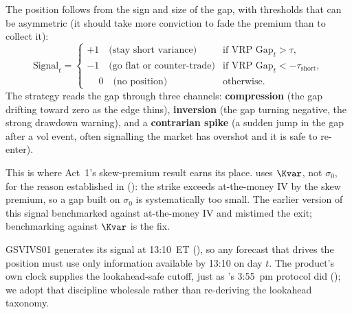 The position follows from the sign and size of the gap, with thresholds that can be asymmetric (it should take more conviction to fade the premium than to collect it):
\begin{equation}
\label{eq:gsvivs:signalrule}
\text{Signal}_t =
\begin{cases}
+1 \quad \text{(stay short variance)} & \text{if VRP Gap}_t > \tau, \\
-1 \quad \text{(go flat or counter-trade)} & \text{if VRP Gap}_t < -\tau_{\text{short}}, \\
\phantom{+}0 \quad \text{(no position)} & \text{otherwise.}
\end{cases}
\end{equation}
The strategy reads the gap through three channels: \textbf{compression} (the gap drifting toward zero as the edge thins), \textbf{inversion} (the gap turning negative, the strong drawdown warning), and a \textbf{contrarian spike} (a sudden jump in the gap after a vol event, often signalling the market has overshot and it is safe to re-enter).

\begin{warning}
This is where Act~1's skew-premium result earns its place.  uses $\Kvar$, not $\sigma_0$, for the reason established in  (): the strike exceeds at-the-money IV by the skew premium, so a gap built on $\sigma_0$ is systematically too small. The earlier version of this signal benchmarked against at-the-money IV and mistimed the exit; benchmarking against $\Kvar$ is the fix.
\end{warning}

\begin{keyidea}
GSVIVS01 generates its signal at 13:10~ET (), so any forecast that drives the position must use only information available by 13:10 on day $t$. The product's own clock supplies the lookahead-safe cutoff, just as 's 3:55~pm protocol did (); we adopt that discipline wholesale rather than re-deriving the lookahead taxonomy.
\end{keyidea}

